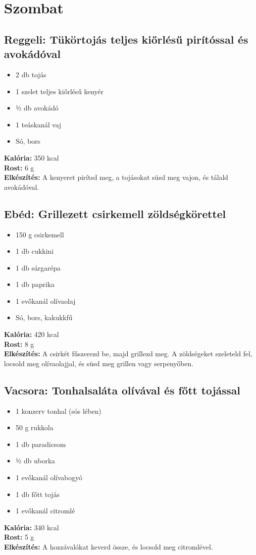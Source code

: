 \newpage
\section{Szombat}
\sordisz
\subsection{Reggeli: Tükörtojás teljes kiőrlésű pirítóssal és avokádóval}
\begin{itemize}
    \item 2 db tojás
    \item 1 szelet teljes kiőrlésű kenyér
    \item ½ db avokádó
    \item 1 teáskanál vaj
    \item Só, bors
\end{itemize}
\textbf{Kalória:} 350 kcal \\
\textbf{Rost:} 6 g \\
\textbf{Elkészítés:} A kenyeret pirítsd meg, a tojásokat süsd meg vajon, és tálald avokádóval.

\sordisz
\subsection{Ebéd: Grillezett csirkemell zöldségkörettel}
\begin{itemize}
    \item 150 g csirkemell
    \item 1 db cukkini
    \item 1 db sárgarépa
    \item 1 db paprika
    \item 1 evőkanál olívaolaj
    \item Só, bors, kakukkfű
\end{itemize}
\textbf{Kalória:} 420 kcal \\
\textbf{Rost:} 8 g \\
\textbf{Elkészítés:} A csirkét fűszerezd be, majd grillezd meg. A zöldségeket szeleteld fel, locsold meg olívaolajjal, és süsd meg grillen vagy serpenyőben.


\sordisz
\subsection{Vacsora: Tonhalsaláta olívával és főtt tojással}
\begin{itemize}
    \item 1 konzerv tonhal (sós lében)
    \item 50 g rukkola
    \item 1 db paradicsom
    \item ½ db uborka
    \item 1 evőkanál olívabogyó
    \item 1 db főtt tojás
    \item 1 evőkanál citromlé
\end{itemize}
\textbf{Kalória:} 340 kcal \\
\textbf{Rost:} 5 g \\
\textbf{Elkészítés:} A hozzávalókat keverd össze, és locsold meg citromlével.

